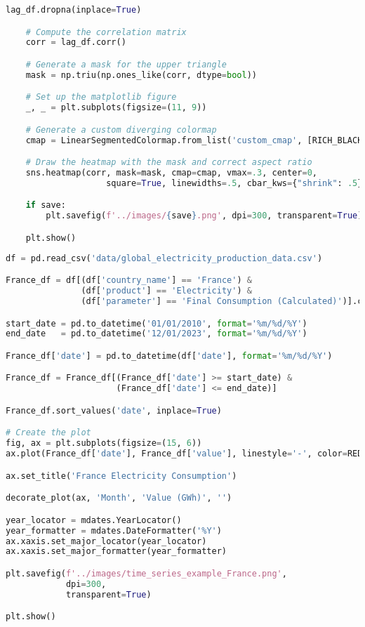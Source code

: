 \begin{center}
\begin{lstlisting}[language=Python]
    lag_df.dropna(inplace=True)

    # Compute the correlation matrix
    corr = lag_df.corr()

    # Generate a mask for the upper triangle
    mask = np.triu(np.ones_like(corr, dtype=bool))

    # Set up the matplotlib figure
    _, _ = plt.subplots(figsize=(11, 9))

    # Generate a custom diverging colormap
    cmap = LinearSegmentedColormap.from_list('custom_cmap', [RICH_BLACK, RED])

    # Draw the heatmap with the mask and correct aspect ratio
    sns.heatmap(corr, mask=mask, cmap=cmap, vmax=.3, center=0,
                    square=True, linewidths=.5, cbar_kws={"shrink": .5})

    if save:
        plt.savefig(f'../images/{save}.png', dpi=300, transparent=True)

    plt.show()
  \end{lstlisting}
\end{center}

\begin{center}
  \begin{lstlisting}[language=Python, 
  caption={Ежемесячное потребление электричества во Франции.}, 
  label={lst:time_series_example_France}]
df = pd.read_csv('data/global_electricity_production_data.csv')

France_df = df[(df['country_name'] == 'France') & 
               (df['product'] == 'Electricity') & 
               (df['parameter'] == 'Final Consumption (Calculated)')].copy()

start_date = pd.to_datetime('01/01/2010', format='%m/%d/%Y')
end_date   = pd.to_datetime('12/01/2023', format='%m/%d/%Y')

France_df['date'] = pd.to_datetime(df['date'], format='%m/%d/%Y')

France_df = France_df[(France_df['date'] >= start_date) & 
                      (France_df['date'] <= end_date)]

France_df.sort_values('date', inplace=True)

# Create the plot
fig, ax = plt.subplots(figsize=(15, 6))
ax.plot(France_df['date'], France_df['value'], linestyle='-', color=RED)

ax.set_title('France Electricity Consumption')

decorate_plot(ax, 'Month', 'Value (GWh)', '')

year_locator = mdates.YearLocator()
year_formatter = mdates.DateFormatter('%Y')
ax.xaxis.set_major_locator(year_locator)
ax.xaxis.set_major_formatter(year_formatter)

plt.savefig(f'../images/time_series_example_France.png', 
            dpi=300, 
            transparent=True)

plt.show()
  \end{lstlisting}
\end{center}

